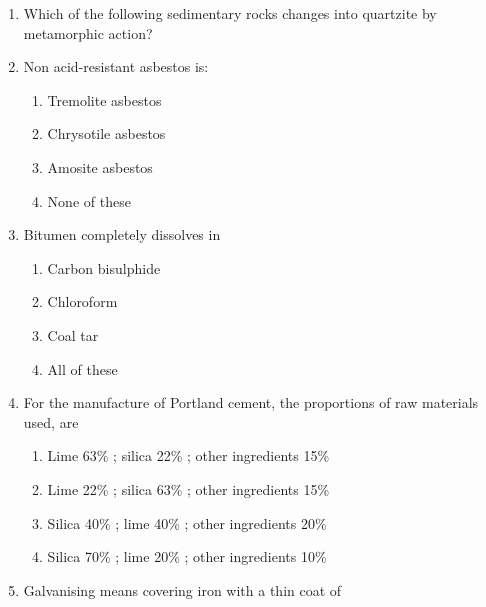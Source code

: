 \documentclass[11pt,a4paper]{article}
\begin{document}
\begin{enumerate}
\begin{enumerate*}[itemjoin=\qquad, label=\Alph*.]
\end{enumerate*}
\item{Which of the following sedimentary rocks changes into quartzite by metamorphic action?}
\\
\item{Non acid-resistant asbestos is:}
\begin{enumerate}[label=\Alph*.]
\item{Tremolite asbestos}
\item{Chrysotile asbestos}
\item{Amosite asbestos}
\item{None of these}
\end{enumerate}
\item{Bitumen completely dissolves in}
\begin{enumerate}[label=\Alph*.]
\item{Carbon bisulphide}
\item{Chloroform}
\item{Coal tar}
\item{All of these}
\end{enumerate}
\item{For the manufacture of Portland cement, the proportions of raw materials used, are}
\begin{enumerate}[label=\Alph*.]
\item{Lime 63\% ; silica 22\% ; other ingredients 15\%}
\item{Lime 22\% ; silica 63\% ; other ingredients 15\%}
\item{Silica 40\% ; lime 40\% ; other ingredients 20\%}
\item{Silica 70\% ; lime 20\% ; other ingredients 10\%}
\end{enumerate}
\item{Galvanising means covering iron with a thin coat of}
\\
\end{enumerate}
\end{document}
